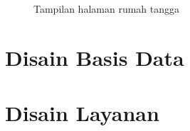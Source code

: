 \begin{figure}
\centering
{}
\caption[Tampilan halaman rumah tangga]{Tampilan halaman rumah tangga} 
\label{fig:design_web_index_rumah_tangga}
\end{figure}

\section{Disain Basis Data}
\label{sec:disainbasisdata}

\section{Disain Layanan}
\label{sec:disainlayanan}



